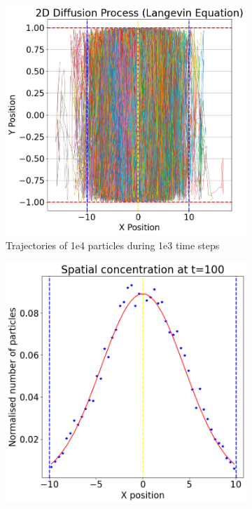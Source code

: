 \documentclass{article}
\begin{document}
\begin{figure}[htbp]
    \centering
    \begin{subfigure}[b]{0.3\textwidth}
        \centering
        \includegraphics[width=\textwidth]{images/trajectoriesInfinite.png} %
        \caption{Trajectories of 1e4 particles during 1e3 time steps}
        \label{fig:subplotTrInf}
    \end{subfigure}
    \hfill
    \begin{subfigure}[b]{0.3\textwidth}
        \centering
        \includegraphics[width=\textwidth]{images/verificationInfinite1e4.png} %

\end{subfigure}
\end{figure}
\end{document}
